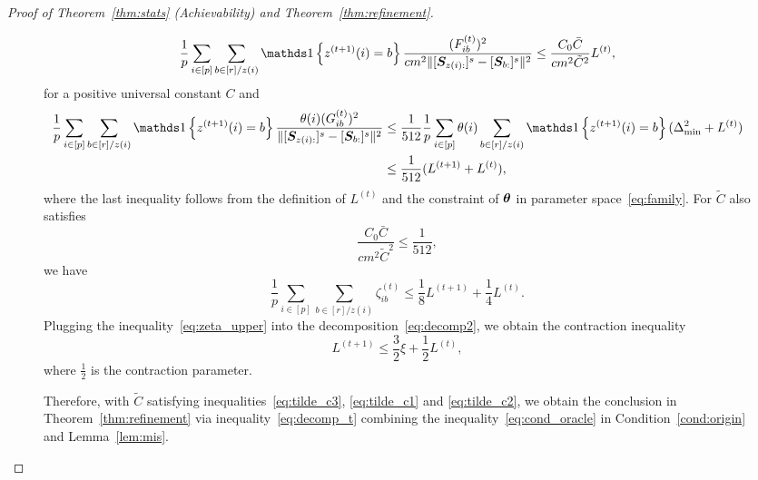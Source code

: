 \documentclass[journal]{IEEEtran}
\theoremstyle{definition}
\theoremstyle{definition}
\newcommand{\offf}[1]{\left\{#1\right\}}
\def\fixme#1#2{\textbf{\color{red}[FIXME (#1): #2]}}
\begin{document}
\begin{proof}[Proof of Theorem~\ref{thm:stats} (Achievability) and Theorem~\ref{thm:refinement}]
\begin{figure}[t]
\setcounter{equation}{75} 
\begin{equation}\label{eq:f_sum}
          \frac{1}{p} \sum_{i \in [p]}\sum_{b \in [r]/z(i)} \ind \offf{ z^{(t+1)}(i) = b} \frac{(F_{ib}^{(t)})^2}{ cm^2 \onormSize{}{ [ \mS_{z(i):}  ]^s - [ \mS_{b:}  ]^s  }^2} \leq \frac{C_0 \bar C}{c m^2 \tilde C^2} L^{(t)},
    \end{equation}
    for a positive universal constant $C$ and 
    \begin{align}
         \frac{1}{p} \sum_{i \in [p]}\sum_{b \in [r]/z(i)} \ind \offf{ z^{(t+1)}(i) = b} \frac{\theta(i)(G_{ib}^{(t)})^2}{ \onormSize{}{ [ \mS_{z(i):}  ]^s - [ \mS_{b:}  ]^s  }^2}  &\leq \frac{1}{512} \frac{1}{p} \sum_{i \in [p]}\theta(i) \sum_{b \in [r]/z(i)}   \ind \offf{ z^{(t+1)}(i) = b}  (\Delta_{\min}^2 + L^{(t)}) \\
         & \leq \frac{1}{512} (L^{(t+1)} + L^{(t)}), \label{eq:g_sum}
    \end{align}
 where the last inequality follows from the definition of $L^{(t)}$ and the constraint of $\boldsymbol{\theta}$ in parameter space~\eqref{eq:family}. For $\tilde C$ also satisfies 
    \begin{equation}\label{eq:tilde_c3}
         \frac{C_0 \bar C}{c m^2 \tilde C^2} \leq \frac{1}{512},
    \end{equation}
    we have 
    \begin{equation}\label{eq:zeta_upper}
        \frac{1}{p}\sum_{i \in [p] }  \sum_{b \in [r]/z(i)}  \zeta_{ib}^{(t)} \leq  \frac{1}{8} L^{(t+1)}  + \frac{1}{4} L^{(t)}.
    \end{equation}
    Plugging the inequality~\eqref{eq:zeta_upper} into the decomposition~\eqref{eq:decomp2}, we obtain the contraction inequality 
    \begin{equation}\label{eq:decomp_t}
          L^{(t+1)} \leq \frac{3}{2} \xi  + \frac{1}{2} L^{(t)},
    \end{equation}
     where $\frac{1}{2}$ is the contraction parameter. 
     
     Therefore, with $\tilde C$ satisfying inequalities~\eqref{eq:tilde_c3}, \eqref{eq:tilde_c1} and \eqref{eq:tilde_c2}, we obtain the conclusion in Theorem~\ref{thm:refinement} via inequality~\eqref{eq:decomp_t} combining the inequality~\eqref{eq:cond_oracle} in Condition~\ref{cond:origin} and Lemma~\ref{lem:mis}. 
     

\end{figure}
\end{proof}
\end{document}
